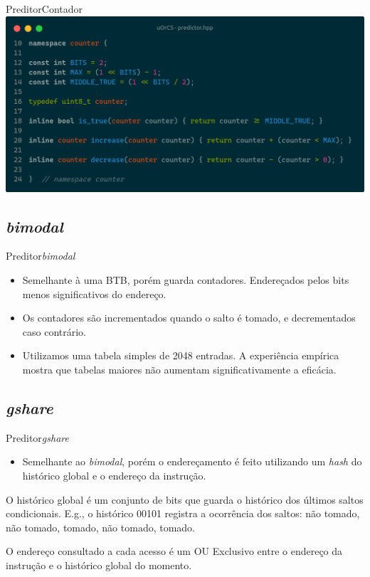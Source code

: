 \documentclass{beamer}
\begin{document}
\begin{frame}{Preditor}{Contador}
	\includegraphics[width=\textwidth]{contador.png}
\end{frame}

\subsection{\textit{bimodal}}

\begin{frame}{Preditor}{\textit{bimodal}}
	\begin{itemize}
		\item Semelhante à uma BTB, porém guarda contadores. Endereçados pelos bits
		      menos significativos do endereço.
		\item Os contadores são incrementados quando o salto é tomado, e
		      decrementados caso contrário.
		\item Utilizamos uma tabela simples de 2048 entradas. A experiência empírica
		      mostra que tabelas maiores não aumentam significativamente a eficácia.
	\end{itemize}
\end{frame}

\subsection{\textit{gshare}}

\begin{frame}{Preditor}{\textit{gshare}}
	\begin{itemize}
		\item Semelhante ao \textit{bimodal}, porém o endereçamento é feito
		      utilizando um \textit{hash} do histórico global e o endereço da
		      instrução.
	\end{itemize}

	\vfill

	O histórico global é um conjunto de bits que guarda o histórico dos últimos
	saltos condicionais. E.g., o histórico 00101 registra a ocorrência dos saltos:
	não tomado, não tomado, tomado, não tomado, tomado.

	\vfill

	O endereço consultado a cada acesso é um OU Exclusivo entre o endereço da
	instrução e o histórico global do momento.
\end{frame}
\end{document}
